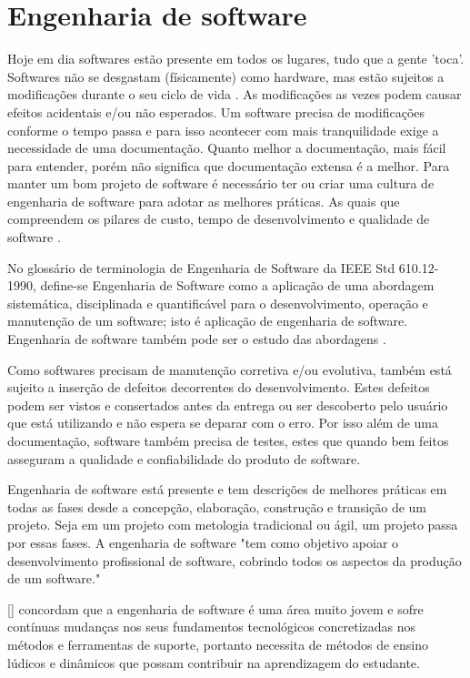 \section[Engenharia de software]{Engenharia de software}
Hoje em dia softwares estão presente em todos os lugares, tudo que a gente 'toca'. Softwares não se desgastam (físicamente) como hardware, mas estão sujeitos a modificações durante o seu ciclo de vida \cite{Silva_filho}. As modificações as vezes podem causar efeitos acidentais e/ou não esperados. Um software precisa de modificações conforme o tempo passa e para isso acontecer com mais tranquilidade exige a necessidade de uma documentação. Quanto melhor a documentação, mais fácil para entender, porém não significa que documentação extensa é a melhor. Para manter um bom projeto de software é necessário ter ou criar uma cultura de engenharia de software para adotar as melhores práticas. As quais que compreendem os pilares de custo, tempo de desenvolvimento e qualidade de software \cite{Silva_filho}.

No glossário de terminologia de Engenharia de Software da IEEE Std 610.12-1990, define-se Engenharia de Software como a aplicação de uma abordagem sistemática, disciplinada e quantificável para o desenvolvimento, operação e manutenção de um software; isto é aplicação de engenharia de software. Engenharia de software também pode ser o estudo das abordagens \cite{ieeeTerminology}.

Como softwares precisam de manutenção corretiva e/ou evolutiva, também está sujeito a inserção de defeitos decorrentes do desenvolvimento. Estes defeitos podem ser vistos e consertados antes da entrega \cite{Silva_filho} ou ser descoberto pelo usuário que está utilizando e não espera se deparar com o erro. Por isso além de uma documentação, software também precisa de testes, estes que quando bem feitos asseguram a qualidade e confiabilidade do produto de software.

Engenharia de software está presente e tem descrições de melhores práticas em todas as fases desde a concepção, elaboração, construção e transição de um projeto. Seja em um projeto com metologia tradicional ou ágil, um projeto passa por essas fases. A engenharia de software "tem como objetivo apoiar o desenvolvimento profissional de software, cobrindo todos os aspectos da produção de um software."

[\cite{sucessoJogoEngSoft}] \cite{benittiMolleri} concordam que a engenharia de software é uma área muito jovem e sofre contínuas mudanças nos seus fundamentos tecnológicos concretizadas nos métodos e ferramentas de suporte, portanto necessita de métodos de ensino lúdicos e dinâmicos que possam contribuir na aprendizagem do estudante.


